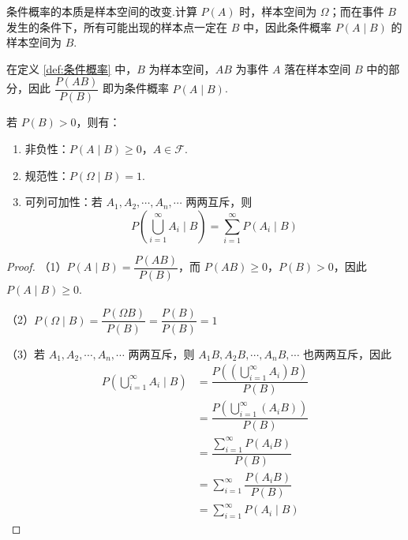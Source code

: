 \begin{note}
    \indent 条件概率的本质是样本空间的改变.计算 $P(A)$ 时，样本空间为 $\varOmega$；而在事件 $B$ 发生的条件下，所有可能出现的样本点一定在 $B$ 中，因此条件概率 $P(A \mid B)$ 的样本空间为 $B$.

    \vspace{0.5em}
    
    在定义 \ref{def:条件概率} 中，$B$ 为样本空间，$AB$ 为事件 $A$ 落在样本空间 $B$ 中的部分，因此 $\dfrac{P(AB)}{P(B)}$ 即为条件概率 $P(A \mid B)$.
\end{note}

\begin{property}
    \indent 若 $P(B) > 0$，则有：
    \begin{enumerate}
        \item 非负性：$P(A \mid B) \geqslant 0$，$A \in \mathcal{F}$.
        \item 规范性：$P(\varOmega \mid B) = 1$.
        \item 可列可加性：若 $A_1, A_2, \cdots, A_n, \cdots$ 两两互斥，则
        $$
        P \left( \bigcup_{i=1}^{\infty} A_i \mid B \right) = \sum_{i=1}^{\infty} P(A_i \mid B)
        $$
    \end{enumerate}
\end{property}

\begin{proof}
    （1）$P(A \mid B) = \dfrac{P(AB)}{P(B)}$，而 $P(AB) \geqslant 0$，$P(B)>0$，因此 $P(A \mid B) \geqslant 0$.

    \vspace{0.5em}

    （2）$P(\varOmega \mid B) = \dfrac{P(\varOmega B)}{P(B)} = \dfrac{P(B)}{P(B)} = 1$

    \vspace{0.5em}

    （3）若 $A_1, A_2, \cdots, A_n, \cdots$ 两两互斥，则 $A_1 B, A_2 B, \cdots, A_n B, \cdots$ 也两两互斥，因此
    $$
    \begin{aligned}
        P \left( \bigcup_{i=1}^{\infty} A_i \mid B \right) &= \dfrac{P \left( \left( \displaystyle\bigcup_{i=1}^{\infty} A_i \right) B \right)}{P(B)} \\
        &= \dfrac{P \left( \displaystyle\bigcup_{i=1}^{\infty} (A_i B) \right)}{P(B)} \\
        &= \dfrac{\displaystyle\sum_{i=1}^{\infty} P(A_i B)}{P(B)} \\
        &= \sum_{i=1}^{\infty} \dfrac{P(A_i B)}{P(B)} \\
        &= \sum_{i=1}^{\infty} P(A_i \mid B)
    \end{aligned}
    $$
\end{proof}

